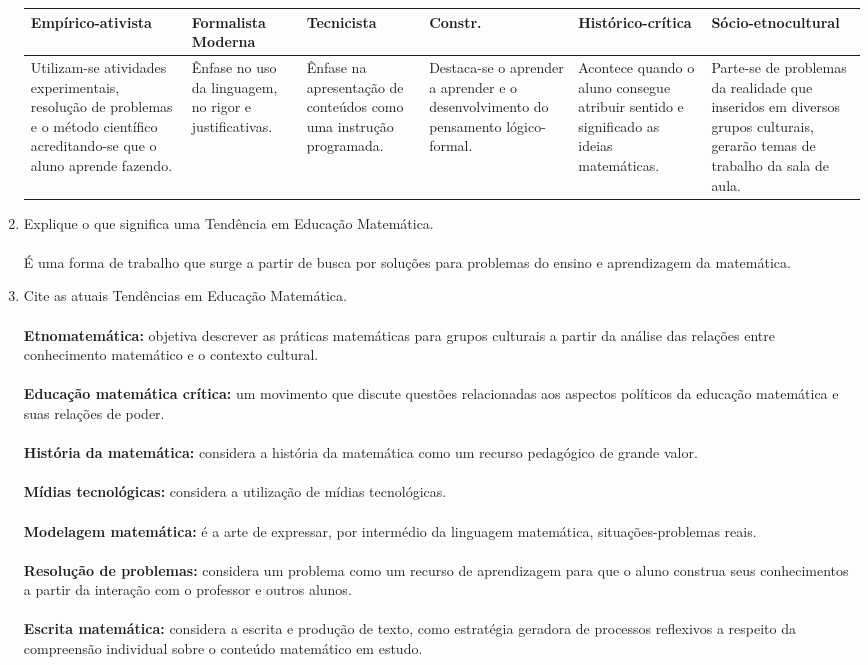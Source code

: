 \documentclass[a4paper, 12pt]{article}
\begin{document}
\begin{enumerate}
  \begin{tabular}{ m{2cm} | m{2cm} | m{2cm} | m{2cm} | m{2cm} | m{2cm} |}
    \textbf{Empírico-ativista} & \textbf{Formalista Moderna} & \textbf{Tecnicista} & \textbf{Constr.} & \textbf{Histórico-crítica} & \textbf{Sócio-etnocultural} \\ \hline
    Utilizam-se atividades experimentais, resolução de problemas e o método científico acreditando-se que o aluno aprende fazendo. &
    Ênfase no uso da linguagem, no rigor e justificativas. &
    Ênfase na apresentação de conteúdos como uma instrução programada. &
    Destaca-se o aprender a aprender e o desenvolvimento do pensamento lógico-formal. &
    Acontece quando o aluno consegue atribuir sentido e significado as ideias matemáticas. &
    Parte-se de problemas da realidade que inseridos em diversos grupos culturais, gerarão temas de trabalho da sala de aula.
  \end{tabular}
\item Explique o que significa uma Tendência em Educação Matemática. \\ \\
  É uma forma de trabalho que surge a partir de busca por soluções para problemas do ensino e aprendizagem da matemática.
\item Cite as atuais Tendências em Educação Matemática. \\ \\
  \textbf{Etnomatemática:} objetiva descrever as práticas matemáticas para grupos culturais a partir da análise das relações entre conhecimento matemático e o contexto cultural. \\ \\  
  \textbf{Educação matemática crítica:} um movimento que discute questões relacionadas aos aspectos políticos da educação matemática e suas relações de poder. \\ \\
  \textbf{História da matemática:} considera a história da matemática como um recurso pedagógico de grande valor. \\ \\
  \textbf{Mídias tecnológicas:} considera a utilização de mídias tecnológicas. \\ \\
  \textbf{Modelagem matemática:} é a arte de expressar, por intermédio da linguagem matemática, situações-problemas reais. \\ \\
  \textbf{Resolução de problemas:} considera um problema como um recurso de aprendizagem para que o aluno construa seus conhecimentos a partir da interação com o professor e outros alunos. \\ \\
  \textbf{Escrita matemática:} considera a escrita e produção de texto, como estratégia geradora de processos reflexivos a respeito da compreensão individual sobre o conteúdo matemático em estudo.
 \end{enumerate}
\end{document}
